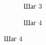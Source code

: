 \begin{figure}[H]
  \centering
  
  \begin{subfigure}[b]{0.45\textwidth}
    \centering
    
    \caption{Шаг 3}

  \end{subfigure}
  \qquad
  \begin{subfigure}[b]{0.45\textwidth}
    \centering
    
    \caption{Шаг 4}

  \end{subfigure}
\end{figure}
